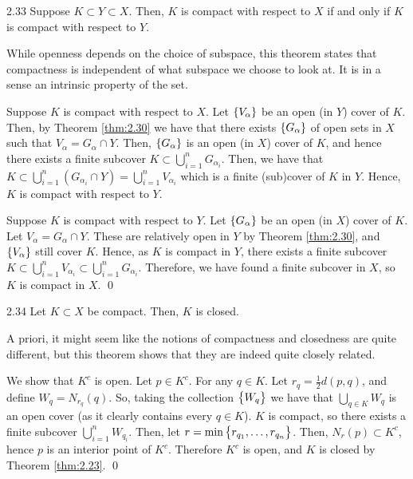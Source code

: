 \begin{theorem}{}{2.33}
    Suppose $K \subset Y \subset X$. Then, $K$ is compact with respect to $X$ if and only if $K$ is compact with respect to $Y$.
\end{theorem}

\noindent While openness depends on the choice of subspace, this theorem states that compactness is independent of what subspace we choose to look at. It is in a sense an intrinsic property of the set.

\begin{nproof}
    \boxed{\implies} Suppose $K$ is compact with respect to $X$. Let $\set{V_\alpha}$ be an open (in $Y$) cover  of $K$. Then, by Theorem \ref{thm:2.30} we have that there exists $\set{G_\alpha}$ of open sets in $X$ such that $V_\alpha = G_\alpha \cap Y$. Then, $\set{G_\alpha}$ is an open (in $X$) cover of $K$, and hence there exists a finite subcover $K \subset \bigcup_{i=1}^n G_{\alpha_i}$. Then, we have that $K \subset \bigcup_{i=1}^n (G_{\alpha_i} \cap Y) = \bigcup_{i=1}^n V_{\alpha_i}$ which is a finite (sub)cover of $K$ in $Y$. Hence, $K$ is compact with respect to $Y$.
    
    \boxed{\impliedby} Suppose $K$ is compact with respect to $Y$. Let $\set{G_\alpha}$ be an open (in $X$) cover of $K$. Let $V_\alpha = G_\alpha \cap Y$. These are relatively open in $Y$ by Theorem \ref{thm:2.30}, and $\set{V_\alpha}$ still cover $K$. Hence, as $K$ is compact in $Y$, there exists a finite subcover $K \subset \bigcup_{i=1}^n V_{\alpha_i} \subset \bigcup_{i=1}^n G_{\alpha_i}$. Therefore, we have found a finite subcover in $X$, so $K$ is compact in $X$. \qed
\end{nproof}

\begin{theorem}{}{2.34}
    Let $K \subset X$ be compact. Then, $K$ is closed.
\end{theorem}

\noindent A priori, it might seem like the notions of compactness and closedness are quite different, but this theorem shows that they are indeed quite closely related.

\begin{nproof}
    We show that $K^c$ is open. Let $p \in K^c$. For any $q \in K$. Let $r_{q} = \frac{1}{2}d(p, q)$, and define $W_q = N_{r_q}(q)$. So, taking the collection $\set{W_q}$ we have that $\bigcup_{q \in K} W_q$ is an open cover (as it clearly contains every $q \in K$). $K$ is compact, so there exists a finite subcover $\bigcup_{i=1}^n W_{q_i}$. Then, let $r = \min\set{r_{q_1}, \ldots, r_{q_n}}$. Then, $N_r(p) \subset K^c$, hence $p$ is an interior point of $K^c$. Therefore $K^c$ is open, and $K$ is closed by Theorem \ref{thm:2.23}. \qed
\end{nproof}

